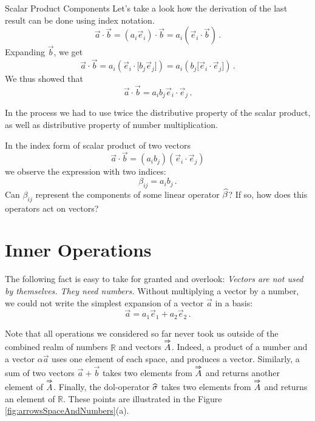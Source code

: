 \begin{mybio}{Scalar Product Components}
Let's take a look how the derivation of the last result can be done
using index notation.
\[
\vec{a}\cdot\vec{b} = (a_i\vec{e}_i)\cdot\vec{b} = a_i(\vec{e}_i\cdot\vec{b})\,.
\]
Expanding $\vec{b}$, we get
\[
\vec{a}\cdot\vec{b} = a_i(\vec{e}_i\cdot\lbrack b_j\vec{e}_j\rbrack) = a_i(b_j\lbrack\vec{e}_i\cdot\vec{e}_j\rbrack)\,.
\]
We thus showed that
\[
\vec{a}\cdot\vec{b} = a_ib_j\vec{e}_i\cdot\vec{e}_j\,.
\]

In the process we had to use twice the distributive property of the
scalar product, as well as distributive property of number
multiplication.
\end{mybio}

\begin{exercise}\label{exe:projectorOperatorFromScalarProduct}
  In the index form of scalar product of two vectors
  \[
  \vec{a}\cdot\vec{b} = (a_ib_j)(\vec{e}_i\cdot\vec{e}_j)
  \]
  we observe the expression with two indices:
  \[
  \beta_{ij} = a_ib_j\,.
  \]
  Can $\beta_{ij}$ represent the components of some linear
  operator $\widehat{\beta}$? If so, how does this operators act on vectors?
\end{exercise}


\section{Inner Operations}
The following fact is easy to take for granted and overlook:
\emph{Vectors are not used by themselves. They need numbers.}  Without
multiplying a vector by a number, we could not write the
simplest expansion of a vector $\vec{a}$ in a basis:
\begin{equation*}
	\vec{a} = a_1\vec{e}_1 + a_2\vec{e}_2\,.
\end{equation*}

Note that all operations we considered so far never took us
outside of the combined realm of numbers $\mathbb{R}$ and vectors
$\overset{\Rightarrow}{A}$. Indeed, a product of a number and a vector $\alpha\vec{a}$
uses one element of each space, and produces a vector. Similarly, a
sum of two vectors $\vec{a} + \vec{b}$ takes two elements from
$\overset{\Rightarrow}{A}$ and returns another element of
$\overset{\Rightarrow}{A}$. Finally, the dol-operator $\widehat{\sigma}$ takes two  elements from
$\overset{\Rightarrow}{A}$ and returns an element of  $\mathbb{R}$. These points are
illustrated in the Figure \ref{fig:arrowsSpaceAndNumbers}(a).


